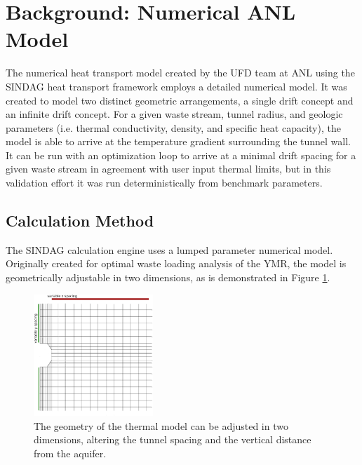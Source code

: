 \documentclass{anstrans}
\begin{document}



\section{Background: Numerical ANL Model}

The numerical heat transport model created by the UFD team at \gls{ANL} using 
the \gls{SINDAG} heat transport framework employs a detailed numerical  model.  
It was created to model two distinct geometric arrangements, a single drift 
concept and an infinite drift concept.  For a given waste stream, tunnel radius, 
and geologic parameters (i.e.  thermal conductivity, density, and specific heat 
capacity), the model is able to arrive  at the temperature gradient surrounding 
the tunnel wall. It can be run with an optimization loop to arrive at a minimal 
drift spacing for a given waste stream in agreement with user input thermal 
limits, but in this validation effort it was run deterministically from 
benchmark parameters. 

\subsection{Calculation Method}

The \gls{SINDAG} calculation engine uses a lumped parameter numerical model.
Originally created for optimal waste loading analysis of the \gls{YMR}, the 
model is geometrically adjustable in two dimensions,  as is demonstrated in 
Figure \ref{fig:sindageom}. 

\begin{figure}[htbp!]
  \begin{center}
    \includegraphics[width=0.4\textwidth]{./sindageom.eps}
  \end{center}
  \caption{The geometry of the thermal model can be adjusted in two dimensions, 
  altering the tunnel spacing and the vertical distance from the aquifer.}
  \label{fig:sindageom}
\end{figure}
\end{document}
